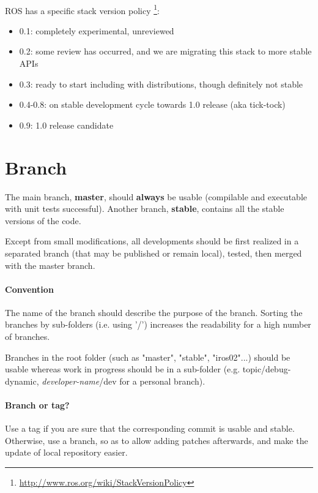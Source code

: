 ~\\
ROS has a specific stack version policy \footnote{\url{http://www.ros.org/wiki/StackVersionPolicy}}:
\begin{itemize}[noitemsep,topsep=0pt,parsep=0pt,partopsep=0pt]
\item 0.1: completely experimental, unreviewed
\item 0.2: some review has occurred, and we are migrating this stack to more stable APIs
\item 0.3: ready to start including with distributions, though definitely not stable
\item 0.4-0.8: on stable development cycle towards 1.0 release (aka tick-tock)
\item 0.9: 1.0 release candidate
\end{itemize}


\section{Branch}
The main branch, \textbf{master}, should \textbf{always} be usable (compilable and executable with unit tests successful).
Another branch, \textbf{stable}, contains all the stable versions of the code.

Except from small modifications, all developments should be first realized in a separated branch (that may be published or remain local), tested, then merged with the master branch.\\


\paragraph{Convention}
The name of the branch should describe the purpose of the branch.
Sorting the branches by sub-folders (i.e. using '/') increases the readability for a high number of branches.

Branches in the root folder (such as "master", "stable", "iros02"...) should be usable whereas 
work in progress should be in a sub-folder (e.g. topic/debug-dynamic, \textit{developer-name}/dev for a personal branch).

\paragraph{Branch or tag?}

Use a tag if you are sure that the corresponding commit is usable and stable.
Otherwise, use a branch, so as to allow adding patches afterwards, and make the update of local repository easier.




